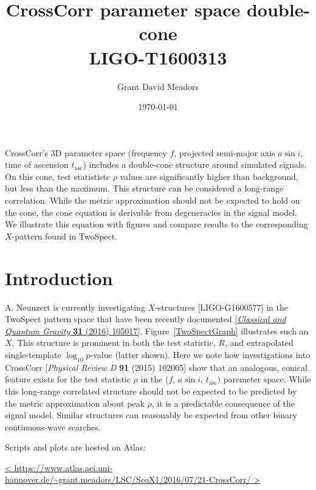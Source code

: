 \documentclass{article}
\begin{document}
\title{CrossCorr parameter space double-cone \\ 
LIGO-T1600313}
\author{Grant David Meadors}
\date{\today}

\maketitle

CrossCorr's 3D parameter space (frequency $f$, projected semi-major axis $a \sin i$, time of ascension $t_\mathrm{asc}$) includes a double-cone structure around simulated signals. 
On this cone, test statististc $\rho$ values are significantly higher than background, but less than the maximum. 
This structure can be considered a long-range correlation. 
While the metric approximation should not be expected to hold on the cone, the cone equation is derivable from degeneracies in the signal model. 
We illustrate this equation with figures and compare results to the corresponding $X$-pattern found in TwoSpect.

\section{Introduction}

A. Neunzert is currently investigating $X$-structures [LIGO-G1600577] in the TwoSpect pattern space that have been recently documented \hyperref[https://dx.doi.org/10.1088/0264-9381/33/10/105017]{[\textit{Classical and Quantum Gravity} \textbf{31} (2016) 105017]}.
Figure~\ref{TwoSpectGraph} illustrates such an $X$.
This structure is prominent in both the test statistic, $R$, and extrapolated single-template $\log_{10} p$-value (latter shown).
Here we note how investigations into CrossCorr [\textit{Physical Review D} \textbf{91} (2015) 102005] show that an analogous, conical feature exists for the test statistic $\rho$ in the ($f$, $a \sin i$, $t_\mathrm{asc})$ paremeter space.
While this long-range correlated structure should not be expected to be predicted by the metric approximation about peak $\rho$, it is a predictable consequence of the signal model.
Similar structures can reasonably be expected from other binary continuous-wave searches.

Scripts and plots are hosted on Atlas:

\begin{center}
\url{<
https://www.atlas.aei.uni-hannover.de/~grant.meadors/LSC/ScoX1/2016/07/21-CrossCorr/
>}
\end{center}
\end{document}
